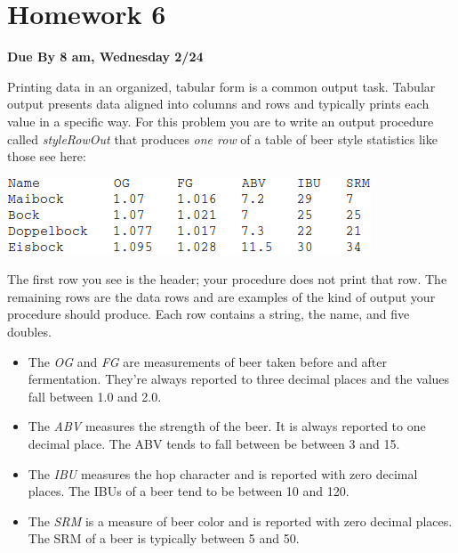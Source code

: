 \documentclass[nobib]{tufte-handout}
\begin{document}
\newpage

\section{Homework 6}

\begin{center}
\textbf{Due By 8 am, Wednesday 2/24}
\end{center}

Printing data in an organized, tabular form is a common output task.  Tabular output presents data aligned into columns and rows and typically prints each value in a specific way.  For this problem you are to write an output procedure called \textit{styleRowOut} that produces \textit{one row} of a table of beer style statistics like those see here:

\vspace{.1in}
\begin{center}
\includegraphics[scale=.5]{tabExample.png}
\end{center}
\vspace{.1in}

The first row you see is the header; your procedure does not print that row. The remaining rows are the data rows and are examples of the kind of output your procedure should produce. Each row contains a string, the name, and five doubles.
\begin{itemize}
\item  The \textit{OG} and \textit{FG} are measurements of beer taken before and after fermentation. They're always reported to three decimal places and the values fall between 1.0 and 2.0. 
\item The \textit{ABV} measures the strength of the beer. It is always reported to one decimal place. The ABV tends to fall between be between 3 and 15.
\item The \textit{IBU} measures the hop character and is reported with zero decimal places. The IBUs of a beer tend to be between 10 and 120.
\item The \textit{SRM} is a measure of beer color and is reported with zero decimal places. The SRM of a beer is typically between 5 and 50. 
\end{itemize}
\end{document}
